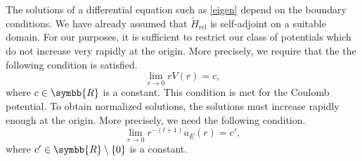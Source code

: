 \documentclass[12pt, a4 paper]{article}
\theoremstyle{definition}
\newcommand{\rr}{\symbb{R}}
\newcommand{\hrel}{\tilde{H}_\text{rel}}
\begin{document}
    The solutions of a differential equation such as \eqref{eigen} depend on the boundary conditions. We have already assumed that \(\hrel\) is self-adjoint on a suitable domain. For our purposes, it is sufficient to restrict our class of potentials which do not increase very rapidly at the origin. More precisely, we require that the the following condition is satisfied.
    \[
        \lim_{r \rightarrow 0} rV(r) = c,
    \]
    where \(c \in \rr\) is a constant. This condition is met for the Coulomb potential. To obtain normalized solutions, the solutions must increase rapidly enough at the origin. More precisely, we need the following condition.
    \[
        \lim_{r \rightarrow 0} r^{-(l+1)} u_E(r) = c',
    \]
    where \(c' \in \rr\setminus\{0\}\) is a constant.

    \nocite{*}
    \printbibliography[heading=bibintoc]
    \printindex
\end{document}
